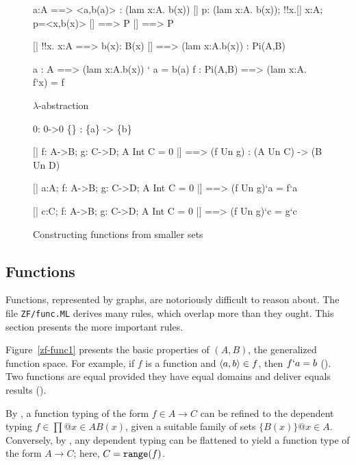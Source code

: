\begin{figure}
\begin{ttbox}
         a:A ==> <a,b(a)> : (lam x:A. b(x))
         [| p: (lam x:A. b(x));  !!x.[| x:A; p=<x,b(x)> |] ==> P 
             |] ==>  P

     [| !!x. x:A ==> b(x): B(x) |] ==> (lam x:A.b(x)) : Pi(A,B)

         a : A ==> (lam x:A.b(x)) ` a = b(a)
          f : Pi(A,B) ==> (lam x:A. f`x) = f
\end{ttbox}
\caption{$\lambda$-abstraction} \label{zf-lam}
\end{figure}


\begin{figure}
\begin{ttbox}
            0: 0->0
           \{<a,b>\} : \{a\} -> \{b\}

      [| f: A->B;  g: C->D;  A Int C = 0  |] ==>  
                     (f Un g) : (A Un C) -> (B Un D)

  [| a:A;  f: A->B;  g: C->D;  A Int C = 0 |] ==>  
                     (f Un g)`a = f`a

  [| c:C;  f: A->B;  g: C->D;  A Int C = 0 |] ==>  
                     (f Un g)`c = g`c
\end{ttbox}
\caption{Constructing functions from smaller sets} \label{zf-func2}
\end{figure}


\subsection{Functions}
Functions, represented by graphs, are notoriously difficult to reason
about.  The file {\tt ZF/func.ML} derives many rules, which overlap more
than they ought.  This section presents the more important rules.

Figure~\ref{zf-func1} presents the basic properties of $(A,B)$,
the generalized function space.  For example, if $f$ is a function and
$\langle a,b\rangle\in f$, then $f`a=b$ ().  Two functions
are equal provided they have equal domains and deliver equals results
().

By , a function typing of the form $f\in A\to C$ can be
refined to the dependent typing $f\in\prod@{x\in A}B(x)$, given a suitable
family of sets $\{B(x)\}@{x\in A}$.  Conversely, by ,
any dependent typing can be flattened to yield a function type of the form
$A\to C$; here, $C={\tt range}(f)$.


